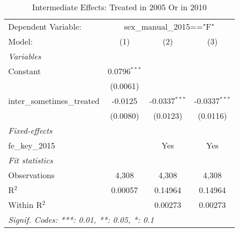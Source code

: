 
\begin{table}[htbp]
   \caption{Intermediate Effects: Treated in 2005 Or in 2010}
   \centering
   \begin{tabular}{lccc}
      \tabularnewline \midrule \midrule
      Dependent Variable: & \multicolumn{3}{c}{sex\_manual\_2015=="F"}\\
      Model:                      & (1)            & (2)             & (3)\\  
      \midrule
      \emph{Variables}\\
      Constant                    & 0.0796$^{***}$ &                 &   \\   
                                  & (0.0061)       &                 &   \\   
      inter\_sometimes\_treated   & -0.0125        & -0.0337$^{***}$ & -0.0337$^{***}$\\   
                                  & (0.0080)       & (0.0123)        & (0.0116)\\   
      \midrule
      \emph{Fixed-effects}\\
      fe\_key\_2015               &                & Yes             & Yes\\  
      \midrule
      \emph{Fit statistics}\\
      Observations                & 4,308          & 4,308           & 4,308\\  
      R$^2$                       & 0.00057        & 0.14964         & 0.14964\\  
      Within R$^2$                &                & 0.00273         & 0.00273\\  
      \midrule \midrule
      \multicolumn{4}{l}{\emph{Signif. Codes: ***: 0.01, **: 0.05, *: 0.1}}\\
   \end{tabular}
\end{table}


